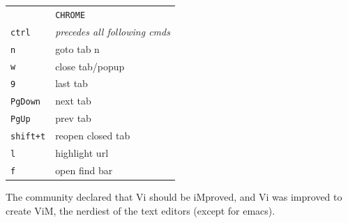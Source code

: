 \documentclass[a4paper,12pt]{article}
\begin{document}
\begin{multicols}{2}
\begin{tabular}{ll}
\\
&\texttt{CHROME}\\
\texttt{ctrl}&\emph{precedes all following cmds}\\
\texttt{n}&goto tab n\\
\texttt{w}&close tab/popup\\
\texttt{9}&last tab\\
\texttt{PgDown}&next tab\\
\texttt{PgUp}&prev tab\\
\texttt{shift+t}&reopen closed tab\\
\texttt{l}&highlight url\\
\texttt{f}&open find bar\\
\end{tabular}

\vfill
\columnbreak
The community declared that Vi should be iMproved, and Vi was improved to
create ViM, the nerdiest of the text editors (except for emacs).
\bigskip


\end{multicols}
\end{document}
